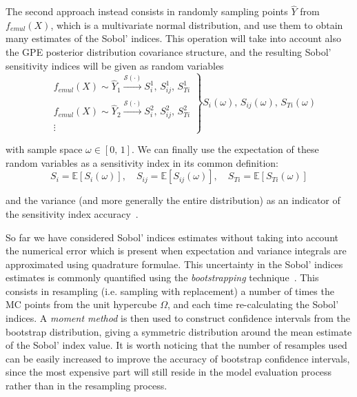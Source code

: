 \noindent
The second approach instead consists in randomly sampling points $\hat{Y}$ from $f_{emul}(X)$, which is a multivariate normal distribution, and use them to obtain many estimates of the Sobol' indices. This operation will take into account also the GPE posterior distribution covariance structure, and the resulting Sobol' sensitivity indices will be given as random variables
%
\begin{equation}\label{eq:emulpostsamplesgsa1}
    \left.
        \begin{array}{ll}
            & f_{emul}(X)\sim\hat{Y}_1\xrightarrow[]{\mathcal{S}(\cdot)} S_{i}^{1},\,S_{ij}^{1},\,S_{Ti}^{1} \\
            & f_{emul}(X)\sim\hat{Y}_2\xrightarrow[]{\mathcal{S}(\cdot)} S_{i}^{2},\,S_{ij}^{2},\,S_{Ti}^{2} \\
            & \vdots
        \end{array}
    \right\}S_i(\omega),\,S_{ij}(\omega),\,S_{Ti}(\omega)
\end{equation}

\noindent
with sample space $\omega\in [0,\,1]$. We can finally use the expectation of these random variables as a sensitivity index in its common definition:
%
\begin{equation}\label{eq:emulpostsamplesgsa2}
    S_{i} = \mathbb{E}[S_i(\omega)],\quad S_{ij} = \mathbb{E}[S_{ij}(\omega)],\quad S_{Ti} = \mathbb{E}[S_{Ti}(\omega)]
\end{equation}

\noindent
and the variance (and more generally the entire distribution) as an indicator of the sensitivity index accuracy~\cite{Marrel:2009}.

\vspace{0.2cm}
So far we have considered Sobol' indices estimates without taking into account the numerical error which is present when expectation and variance integrals are approximated using quadrature formulae. This uncertainty in the Sobol' indices estimates is commonly quantified using the \textit{bootstrapping} technique~\cite{Archer:1997}. This consists in resampling (i.e. sampling with replacement) a number of times the MC points from the unit hypercube $\Omega$, and each time re-calculating the Sobol' indices. A \textit{moment method} is then used to construct confidence intervals from the bootstrap distribution, giving a symmetric distribution around the mean estimate of the Sobol' index value. It is worth noticing that the number of resamples used can be easily increased to improve the accuracy of bootstrap confidence intervals, since the most expensive part will still reside in the model evaluation process rather than in the resampling process.

